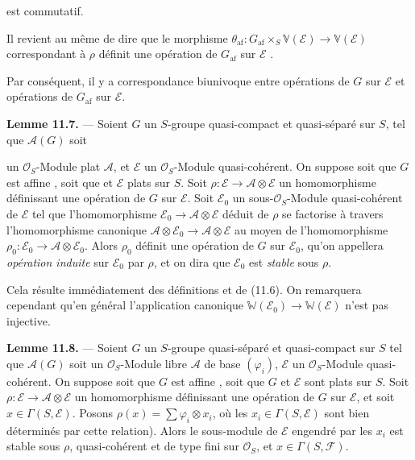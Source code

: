\documentclass[11pt,a4paper]{article}
\begin{document}
est commutatif.

Il revient au même de dire que le morphisme
$\theta_{\mathrm{af}} : G_{\mathrm{af}} \times_{S} \mathbb{V}(\mathcal{E})
\longrightarrow \mathbb{V}(\mathcal{E})$ correspondant à $\rho$ définit une
opération de $G_{\mathrm{af}}$ sur $\mathcal{E}$ \struck{\ill{}}
.

Par conséquent, il y a correspondance biunivoque entre opérations de $G$
sur $\mathcal{E}$ et opérations de $G_{\mathrm{af}}$ sur $\mathcal{E}$.

\textbf{Lemme 11.7.} — Soient $G$ un $S$-groupe quasi-compact et
quasi-séparé sur $S$,  tel que $\mathcal{A}(G)$ soit

un $\mathcal{O}_{S}$-Module plat $\mathcal{A}$, et $\mathcal{E}$ un
$\mathcal{O}_{S}$-Module quasi-cohérent. On suppose soit que $G$ est affine
, soit que  et $\mathcal{E}$  plats
sur $S$. Soit $\rho : \mathcal{E} \to \mathcal{A} \otimes \mathcal{E}$ un
homomorphisme définissant une opération de $G$ sur $\mathcal{E}$. Soit
$\mathcal{E}_{0}$ un sous-$\mathcal{O}_{S}$-Module quasi-cohérent de
$\mathcal{E}$ tel que l'homomorphisme
$\mathcal{E}_{0} \to \mathcal{A} \otimes \mathcal{E}$ déduit de $\rho$ se
factorise à travers l'homomorphisme canonique 
$\mathcal{A} \otimes \mathcal{E}_{0} \longrightarrow
\mathcal{A} \otimes \mathcal{E}$ au moyen de l'homomorphisme
$\rho_{0} : \mathcal{E}_{0} \longrightarrow
\mathcal{A} \otimes \mathcal{E}_{0}$. Alors $\rho_{0}$ définit une
opération de $G$ sur $\mathcal{E}_{0}$, qu'on appellera \emph{opération
induite} sur $\mathcal{E}_{0}$ par $\rho$, et on dira que
$\mathcal{E}_{0}$ est \emph{stable} sous $\rho$.

Cela résulte immédiatement des définitions et de (11.6). On remarquera
cependant qu'en général l'application canonique
$\mathbb{W}(\mathcal{E}_{0}) \longrightarrow \mathbb{W}(\mathcal{E})$
n'est pas injective.

\textbf{Lemme 11.8.} — Soient $G$ un $S$-groupe quasi-séparé et
quasi-compact sur $S$ tel que $\mathcal{A}(G)$ soit un
$\mathcal{O}_{S}$-Module \struck{\ill{}} libre $\mathcal{A}$ de base
$(\varphi_{i})$, $\mathcal{E}$ un $\mathcal{O}_{S}$-Module quasi-cohérent.
On suppose soit que $G$ est affine , soit que $G$ et
$\mathcal{E}$ sont plats sur $S$. Soit
$\rho : \mathcal{E} \to \mathcal{A} \otimes \mathcal{E}$ un homomorphisme
définissant une opération de $G$ sur $\mathcal{E}$, et soit
$x \in \Gamma(S, \mathcal{E})$. Posons
$\rho(x) = \sum \varphi_{i} \otimes x_{i}$, où les
$x_{i} \in \Gamma(S, \mathcal{E})$ sont bien déterminés par cette
relation). Alors le sous-module  de $\mathcal{E}$
engendré par les $x_{i}$ est stable sous $\rho$, quasi-cohérent et de type
fini sur $\mathcal{O}_{S}$, et $x \in \Gamma(S, \mathcal{F})$.
\end{document}
